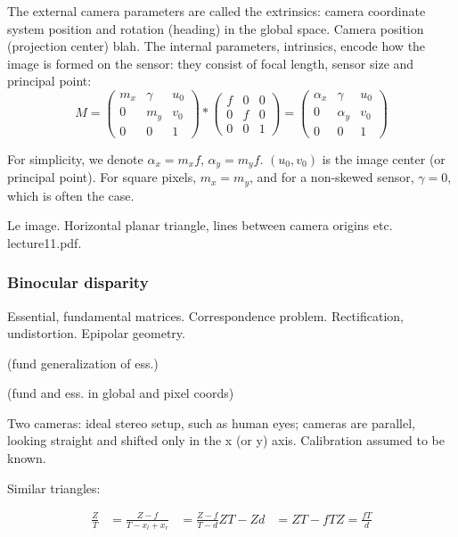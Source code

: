 The external camera parameters are called the extrinsics: camera coordinate system position and rotation (heading) in the global space.
Camera position (projection center) blah.
The internal parameters, intrinsics, encode how the image is formed on the sensor: they consist of focal length, sensor size and principal point:
\begin{equation}
	M =
	\begin{pmatrix}
		m_x & \gamma & u_0\\
		0   &    m_y & v_0\\
		0   &        0 & 1
	\end{pmatrix}
	*
	\begin{pmatrix}
		f & 0 & 0\\
		0 & f & 0\\
		0 & 0 & 1
	\end{pmatrix}
	=
	\begin{pmatrix}
		\alpha_x & \gamma   & u_0\\
		0        & \alpha_y & v_0\\
		0        & 0        & 1
	\end{pmatrix}
\end{equation}

For simplicity, we denote $\alpha_x = m_x f$, $\alpha_y = m_y f$. $(u_0, v_0)$ is the image center (or principal point). For square pixels, $m_x = m_y$, and for a non-skewed sensor, $\gamma = 0$, which is often the case.

Le image. Horizontal planar triangle, lines between camera origins etc. lecture11.pdf.

\subsubsection{Binocular disparity}

Essential, fundamental matrices. Correspondence problem. Rectification, undistortion. Epipolar geometry.

(fund generalization of ess.)

(fund and ess. in global and pixel coords)

Two cameras: ideal stereo setup, such as human eyes; cameras are parallel, looking straight and shifted only in the x (or y) axis. Calibration assumed to be known.

Similar triangles:

\begin{align}
	\frac{Z}{T} &= \frac{Z-f}{T - x_l + x_r} &= \frac{Z-f}{T - d}
	ZT - Zd &= ZT - fT
	Z = \frac{fT}{d}
\end{align}



